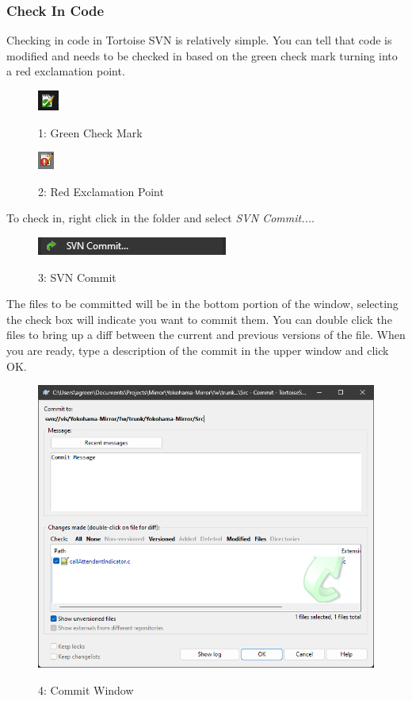 \documentclass[10pt]{article}
\begin{document}
            \subsubsection{Check In Code}
                Checking in code in Tortoise SVN is relatively simple. You can tell that code is modified and needs to be checked in based on the green check mark turning into a red exclamation point.
                \begin{figure}[H]
                    \centerline{\includegraphics{References/Check.png}}
                    \figurename{ 1: Green Check Mark}
                \end{figure}
                \begin{figure}[H]
                    \centerline{\includegraphics{References/X.png}}
                    \figurename{ 2: Red Exclamation Point}
                \end{figure}
                To check in, right click in the folder and select \emph{SVN Commit...}.
                \begin{figure}[H]
                    \centerline{\includegraphics{References/SVN Commit.png}}
                    \figurename{ 3: SVN Commit}
                \end{figure}
                The files to be committed will be in the bottom portion of the window, selecting the check box will indicate you want to commit them. You can double click the files to bring up a diff between the current and previous versions of the file. When you are ready, type a description of the commit in the upper window and click OK.
                \begin{figure}[H]
                    \centerline{\includegraphics[width=\textwidth]{References/SVN Commit Window.png}}
                    \figurename{ 4: Commit Window}
                \end{figure}
\end{document}
